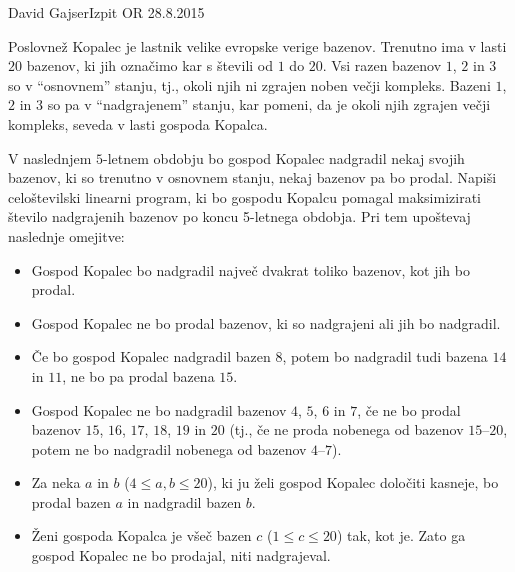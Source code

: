 \begin{naloga}{David Gajser}{Izpit OR 28.8.2015}
\begin{vprasanje}
Poslovnež Kopalec je lastnik velike evropske verige bazenov.
Trenutno ima v lasti $20$ bazenov,
ki jih označimo kar s števili od $1$ do $20$.
Vsi razen bazenov $1$, $2$ in $3$ so v ``osnovnem'' stanju,
tj., okoli njih ni zgrajen noben večji kompleks.
Bazeni $1$, $2$ in $3$ so pa v ``nadgrajenem'' stanju,
kar pomeni, da je okoli njih zgrajen večji kompleks,
seveda v lasti gospoda Kopalca.

V naslednjem $5$-letnem obdobju
bo gospod Kopalec nadgradil nekaj svojih bazenov,
ki so trenutno v osnovnem stanju,
nekaj bazenov pa bo prodal.
Napiši celoštevilski linearni program,
ki bo gospodu Kopalcu pomagal maksimizirati število nadgrajenih bazenov
po koncu 5-letnega obdobja. Pri tem upoštevaj naslednje omejitve:
\begin{itemize}
\item Gospod Kopalec bo nadgradil največ dvakrat toliko bazenov,
kot jih bo prodal.
\item Gospod Kopalec ne bo prodal bazenov,
ki so nadgrajeni ali jih bo nadgradil.
\item Če bo gospod Kopalec nadgradil bazen $8$,
potem bo nadgradil tudi bazena $14$ in $11$, ne bo pa prodal bazena $15$.
\item Gospod Kopalec ne bo nadgradil bazenov $4$, $5$, $6$ in $7$,
če ne bo prodal bazenov $15$, $16$, $17$, $18$, $19$ in $20$
(tj., če ne proda nobenega od bazenov $15$--$20$,
potem ne bo nadgradil nobenega od bazenov $4$--$7$).
\item Za neka $a$ in $b$ ($4 \le a, b \le 20$),
ki ju želi gospod Kopalec določiti kasneje,
bo prodal bazen $a$ in nadgradil bazen $b$.
\item Ženi gospoda Kopalca je všeč bazen $c$ ($1 \le c \le 20$) tak, kot je.
Zato ga gospod Kopalec ne bo prodajal, niti nadgrajeval.
\end{itemize}
\end{vprasanje}


\end{naloga}
